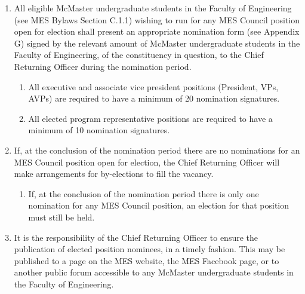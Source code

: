 \begin{enumerate}
 \item
  All eligible McMaster undergraduate students in the Faculty of
  Engineering (see MES Bylaws Section C.1.1) wishing to run for any MES
  Council position open for election shall present an appropriate
  nomination form (see Appendix G) signed by the relevant amount of
  McMaster undergraduate students in the Faculty of Engineering, of the
  constituency in question, to the Chief Returning Officer during the
  nomination period.
  \begin{enumerate}
   \item
    All executive and associate vice president positions (President,
    VPs, AVPs) are required to have a minimum of 20 nomination
    signatures.
   \item
    All elected program representative positions are required to have a
    minimum of 10 nomination signatures.
  \end{enumerate}
 \item
  If, at the conclusion of the nomination period there are no
  nominations for an MES Council position open for election, the Chief
  Returning Officer will make arrangements for by-elections to fill the
  vacancy.

  \begin{enumerate}
   \item
    If, at the conclusion of the nomination period there is only one
    nomination for any MES Council position, an election for that
    position must still be held.
  \end{enumerate}
 \item
  It is the responsibility of the Chief Returning Officer to ensure the
  publication of elected position nominees, in a timely fashion. This
  may be published to a page on the MES website, the MES Facebook page,
  or to another public forum accessible to any McMaster undergraduate
  students in the Faculty of Engineering.

\end{enumerate}

